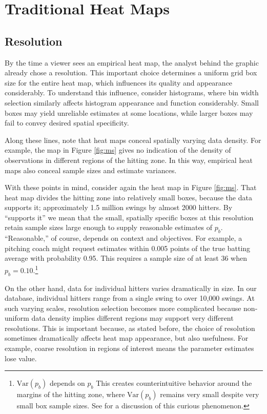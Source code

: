 \section{Traditional Heat Maps}

\subsection{Resolution} %

By the time a viewer sees an empirical heat map, the analyst behind the graphic already chose a resolution. This important choice determines a uniform grid box size for the entire heat map, which influences its quality and appearance considerably. To understand this influence, consider histograms, where bin width selection similarly affects histogram appearance and function considerably. Small boxes may yield unreliable estimates at some locations, while larger boxes may fail to convey desired spatial specificity. 

Along these lines, note that heat maps conceal spatially varying data density. For example, the map in Figure \ref{fig:ms} gives no indication of the density of observations in different regions of the hitting zone. In this way, empirical heat maps also conceal sample sizes and estimate variances.  

With these points in mind, consider again the heat map in Figure \ref{fig:ms}. That heat map divides the hitting zone into relatively small boxes, because the data supports it; approximately 1.5 million swings by almost 2000 hitters. By ``supports it'' we mean that the small, spatially specific boxes at this resolution retain sample sizes large enough to supply reasonable estimates of $p_{b}$. ``Reasonable,'' of course, depends on context and objectives. For example, a pitching coach might request estimates within 0.005 points of the true batting average with probability 0.95. This requires a sample size of at least 36 when $p_{b} = 0.10$.\footnote{$\text{Var}(p_{b})$ depends on $p_{b}$ This creates counterintuitive behavior around the margins of the hitting zone, where $\text{Var}(p_{b})$ remains very small despite very small box sample sizes. See \cite{Dixon2005} for a discussion of this curious phenomenon.}

On the other hand, data for individual hitters varies dramatically in size. In our database, individual hitters range from a single swing to over 10,000 swings. At such varying scales, resolution selection becomes more complicated because non-uniform data density implies different regions may support very different resolutions. This is important because, as stated before, the choice of resolution sometimes dramatically affects heat map appearance, but also usefulness. For example, coarse resolution in regions of interest means the parameter estimates lose value. 

